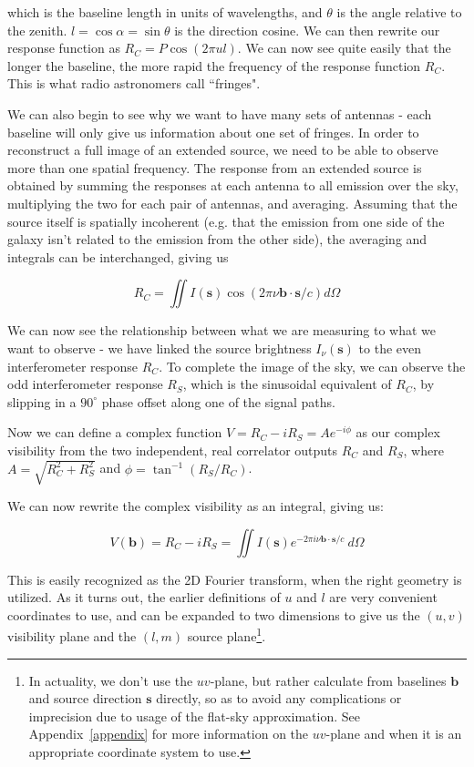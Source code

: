 \noindent which is the baseline length in units of wavelengths, and $\theta$ is 
the angle relative to the zenith. $l = \cos{\alpha} = \sin{\theta}$ is the 
direction cosine. We can then rewrite our response function as $R_C = P \cos{(2 
\pi ul)}$. We can now see quite easily that the longer the baseline, the more 
rapid the frequency of the response function $R_C$. This is what radio 
astronomers call ``fringes".

We can also begin to see why we want to have many sets of antennas - each 
baseline will only give us information about one set of fringes. In order to 
reconstruct a full image of an extended source, we need to be able to observe 
more than one spatial frequency. The response from an extended source is 
obtained by summing the responses at each antenna to all emission over the sky, 
multiplying the two for each pair of antennas, and averaging. Assuming that the 
source itself is spatially incoherent (e.g. that the emission from one side of 
the galaxy isn't related to the emission from the other side), the averaging 
and integrals can be interchanged, giving us

\begin{equation}
    R_C = \iint I(\mathbf s) \cos(2\pi\nu\mathbf{b}\cdot\mathbf{s}/c) d\Omega
    \label{eq:even-response}
\end{equation}

We can now see the relationship between what we are measuring to what we want 
to observe - we have linked the source brightness $I_\nu(\mathbf{s})$ to the 
even interferometer response $R_C$. To complete the image of the sky, we can 
observe the odd interferometer response $R_S$, which is the sinusoidal 
equivalent of $R_C$, by slipping in a $90^{\circ}$ phase offset along one of 
the signal paths.   

Now we can define a complex function $V = R_C - iR_S = A e^{-i \phi}$ as our 
complex visibility from the two independent, real correlator outputs $R_C$ and 
$R_S$, where $A = \sqrt{R_C^2 + R_S^2}$ and $\phi = \tan^{-1}{(R_S/R_C)}$.

We can now rewrite the complex visibility as an integral, giving us:

\begin{equation}
    V(\mathbf{b}) = R_C - iR_S = \iint I(\mathbf s) e^{-2\pi i 
    \nu\mathbf{b}\cdot\mathbf{s}/c} ~d\Omega
    \label{eq:vis}
\end{equation}

This is easily recognized as the 2D Fourier transform, when the right geometry 
is utilized. As it turns out, the earlier definitions of $u$ and $l$ are very 
convenient coordinates to use, and can be expanded to two dimensions to give us 
the $(u,v)$ visibility plane and the $(l,m)$ source plane\footnote{In 
actuality, we don't use the $uv$-plane, but rather calculate from baselines 
$\mathbf{b}$ and source direction $\mathbf{s}$ directly, so as to avoid any 
complications or imprecision due to usage of the flat-sky approximation. See 
Appendix~\ref{appendix} for more information on the $uv$-plane and when it is 
an appropriate coordinate system to use.}.  

